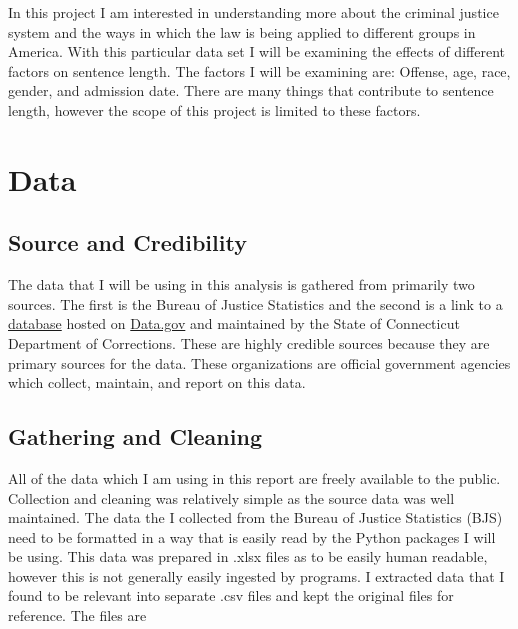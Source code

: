 \documentclass[11pt]{article}
\begin{document}
In this project I am interested in understanding more about the criminal
justice system and the ways in which the law is being applied to
different groups in America. With this particular data set I will be
examining the effects of different factors on sentence length. The
factors I will be examining are: Offense, age, race, gender, and
admission date. There are many things that contribute to sentence
length, however the scope of this project is limited to these factors.

    \hypertarget{data}{%
\section{Data}\label{data}}

\hypertarget{source-and-credibility}{%
\subsection{Source and Credibility}\label{source-and-credibility}}

The data that I will be using in this analysis is gathered from
primarily two sources. The first is the Bureau of Justice Statistics and
the second is a link to a
\href{https://catalog.data.gov/dataset/sentenced-inmates-in-correctional-facilities}{database}
hosted on \href{https://www.data.gov}{Data.gov} and maintained by the
State of Connecticut Department of Corrections. These are highly
credible sources because they are primary sources for the data. These
organizations are official government agencies which collect, maintain,
and report on this data.

\hypertarget{gathering-and-cleaning}{%
\subsection{Gathering and Cleaning}\label{gathering-and-cleaning}}

All of the data which I am using in this report are freely available to
the public. Collection and cleaning was relatively simple as the source
data was well maintained. The data the I collected from the Bureau of
Justice Statistics (BJS) need to be formatted in a way that is easily
read by the Python packages I will be using. This data was prepared in
.xlsx files as to be easily human readable, however this is not
generally easily ingested by programs. I extracted data that I found to
be relevant into separate .csv files and kept the original files for
reference. The files are
\end{document}
